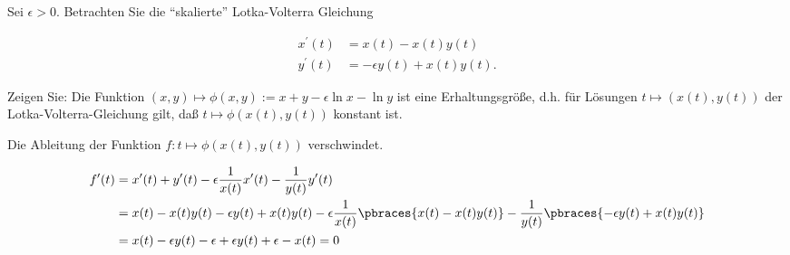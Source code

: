 \begin{exercise}

Sei $\epsilon > 0$. Betrachten Sie die \enquote{skalierte} Lotka-Volterra Gleichung

\begin{align*}
  x^\prime(t) & = x(t) - x(t) y(t) \\
  y^\prime(t) & = -\epsilon y(t) + x(t) y(t).
\end{align*}

Zeigen Sie: Die Funktion $(x, y) \mapsto \phi(x, y) := x + y - \epsilon \ln{x} - \ln{y}$ ist eine Erhaltungsgröße, d.h. für Lösungen $t \mapsto (x(t), y(t))$ der Lotka-Volterra-Gleichung gilt, daß $t \mapsto \phi(x(t), y(t))$ konstant ist.

\end{exercise}

\begin{solution}

Die Ableitung der Funktion $f: t \mapsto \phi(x(t), y(t))$ verschwindet.

\begin{align*}
  f^\prime(t)
  & =
  x^\prime(t) +
  y^\prime(t) -
  \epsilon
  \frac{1}{x(t)} x^\prime(t) -
  \frac{1}{y(t)} y^\prime(t) \\
  & =
  x(t) - x(t) y(t) -
  \epsilon
  y(t) + x(t) y(t) -
  \epsilon
  \frac{1}{x(t)}
  \pbraces
  {
    x(t) - x(t) y(t)
  } -
  \frac{1}{y(t)}
  \pbraces
  {
    -\epsilon
    y(t) + x(t) y(t)
  } \\
  & =
  x(t) - \epsilon y(t) - \epsilon + \epsilon y(t) + \epsilon - x(t) = 0
\end{align*}

\end{solution}
